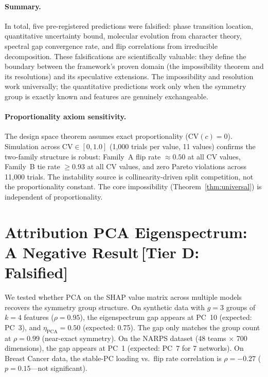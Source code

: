 \documentclass[11pt,a4paper]{article}
\begin{document}
\paragraph{Summary.}
In total, five pre-registered predictions were falsified: phase transition
location, quantitative uncertainty bound, molecular evolution from character
theory, spectral gap convergence rate, and flip correlations from irreducible
decomposition.  These falsifications are scientifically valuable: they define
the boundary between the framework's proven domain (the impossibility theorem
and its resolutions) and its speculative extensions.  The impossibility and
resolution work universally; the quantitative predictions work only when the
symmetry group is exactly known and features are genuinely exchangeable.

\paragraph{Proportionality axiom sensitivity.}
The design space theorem assumes exact proportionality ($\text{CV}(c) = 0$). Simulation across $\text{CV} \in [0, 1.0]$ (1{,}000 trials per value, 11 values) confirms the two-family structure is robust: Family~A flip rate $\approx 0.50$ at all CV values, Family~B tie rate $\geq 0.93$ at all CV values, and zero Pareto violations across 11{,}000 trials. The instability source is collinearity-driven split competition, not the proportionality constant. The core impossibility (Theorem~\ref{thm:universal}) is independent of proportionality.

\section{Attribution PCA Eigenspectrum: A Negative Result\,\textnormal{\normalsize[Tier D: Falsified]}}
\label{sec:attribution-pca}

We tested whether PCA on the SHAP value matrix across multiple models recovers the symmetry group structure.  On synthetic data with $g = 3$ groups of $k = 4$ features ($\rho = 0.95$), the eigenspectrum gap appears at PC~10 (expected: PC~3), and $\eta_{\text{PCA}} = 0.50$ (expected: 0.75).  The gap only matches the group count at $\rho = 0.99$ (near-exact symmetry).  On the NARPS dataset (48 teams $\times$ 700 dimensions), the gap appears at PC~1 (expected: PC~7 for 7 networks).  On Breast Cancer data, the stable-PC loading vs.\ flip rate correlation is $\rho = -0.27$ ($p = 0.15$---not significant).
\end{document}
